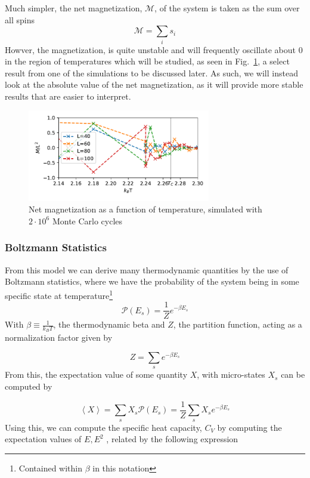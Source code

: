 \documentclass[10pt,showpacs,preprintnumbers,amsmath,amssymb,nofootinbib,aps,prl,twocolumn,groupedaddress,superscriptaddress,showkeys]{revtex4-1}
\begin{document}
    Much simpler, the net magnetization, $\mathcal M$, of the system is taken as the sum over all spins
    \begin{equation*}
      \mathcal M = \sum_i s_i
    \end{equation*}
    Howver, the magnetization, is quite unstable and will frequently oscillate about $0$ in the region of temperatures which will be studied, as seen in Fig.~\ref{fig:net_magnetization}, a select result from one of the simulations to be discussed later. As such, we will instead look at the absolute value of the net magnetization, as it will provide more stable results that are easier to interpret.
    \begin{figure}[H]
      \centering
      \includegraphics[width=8cm]{figs/ex_e_M.pdf}
      \caption{\label{fig:net_magnetization}Net magnetization as a function of temperature, simulated with $2\cdot10^6$ Monte Carlo cycles}
    \end{figure}


    \subsubsection{Boltzmann Statistics}
      From this model we can derive many thermodynamic quantities by the use of Boltzmann statistics, where we have the probability of the system being in some specific state at temperature\footnote{Contained within $\beta$ in this notation}
      \begin{equation}
        \mathcal P(E_s) = \frac{1}{Z} e^{-\beta E_s}
      \end{equation}
      With $\beta \equiv \frac{1}{k_B T}$, the thermodynamic beta and $Z$, the partition function, acting as a normalization factor given by

      \begin{equation}
        Z = \sum_s e^{-\beta E_s}
        \label{eqn:partition function}
      \end{equation}
      From this, the expectation value of some quantity $X$, with micro-states $X_s$ can be computed by

      \begin{equation}
        \left<X\right> = \sum_s X_s \mathcal P(E_s) = \frac{1}{Z} \sum_s X_s e^{-\beta E_s} 
        \label{eqn:expecval}
      \end{equation}
      Using this, we can compute the specific heat capacity, $C_V$ by computing the expectation values of $E, E^2$ \cite{statmek_lecnotes}, related by the following expression
\end{document}
